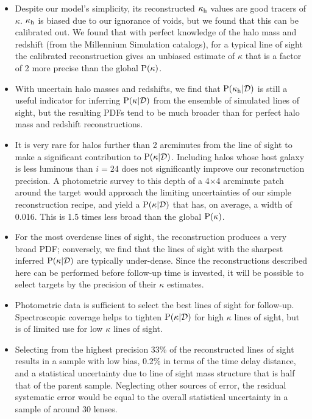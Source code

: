 \documentclass[useAMS,usenatbib]{mn2e}
\begin{document}
\begin{itemize} 

\item Despite our model's simplicity, its reconstructed $\kappa_{\rm h}$ values are
good tracers of $\kappa$. $\kappa_{\rm h}$ is biased due to our ignorance of voids, but we found that this can be calibrated out. We found that with perfect knowledge of
the halo mass and redshift (from the Millennium Simulation catalogs), for a
typical line of sight the calibrated reconstruction gives an unbiased estimate
of $\kappa$ that is a factor of 2 more precise than the global ${\rm P}(\kappa)$.

\item With uncertain halo masses and redshifts, we find that
${\rm P}(\kappa_{\rm h}|{\mathcal{D}})$ is still a useful indicator for inferring
${\rm P}(\kappa|{\mathcal{D}})$ from the ensemble of simulated lines of sight, but the
resulting PDFs tend to be much broader than for perfect halo mass and redshift
reconstructions.

\item It is very rare for halos further than 2 arcminutes from the line of
sight to make a significant contribution to ${\rm P}(\kappa|{\mathcal{D}})$. Including
halos whose host galaxy is less luminous than $i=24$ does not significantly
improve our reconstruction precision.  A photometric survey to this depth of a
4$\times$4 arcminute patch around the target would approach the limiting
uncertainties of our simple reconstruction recipe, and yield a 
${\rm P}(\kappa|{\mathcal{D}})$ that has, on average, a width of 0.016. This is 1.5 times
less broad than the global ${\rm P}(\kappa)$.

\item  For the most overdense lines of sight, the reconstruction produces a
very broad PDF; conversely, we find that the lines of sight with the sharpest
inferred ${\rm P}(\kappa|{\mathcal{D}})$ are typically under-dense. Since the
reconstructions described here can be performed before follow-up time is
invested, it will be possible to  select targets by the precision of their
$\kappa$ estimates. 

\item Photometric data is sufficient  to select the best lines of sight for
follow-up. Spectroscopic coverage helps to tighten  ${\rm P}(\kappa|{\mathcal{D}})$ for
high $\kappa$ lines of sight, but is of limited use for low $\kappa$ lines of
sight.

\item Selecting from the highest precision 33\% of the reconstructed lines of sight
results in a sample with low bias, 0.2\% in terms of the time delay distance,
and a statistical uncertainty due to line of sight mass structure that is half
that of the parent sample. Neglecting other sources of error, the residual systematic error would be equal to the
overall statistical uncertainty in a sample of around 30 lenses.


\end{itemize}
\end{document}
